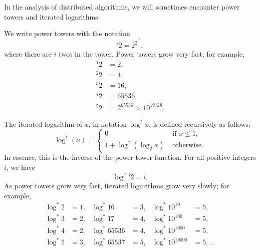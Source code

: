 
In the analysis of distributed algorithms, we will sometimes encounter power towers and iterated logarithms.



We write power towers with the notation
\[
    {}^i 2 = 2^{2^{\cdot^{\cdot^2}}},
\]
where there are $i$ twos in the tower. Power towers grow very fast; for example,
\begin{align*}
    {}^1 2 &= 2,\\
    {}^2 2 &= 4,\\
    {}^3 2 &= 16,\\
    {}^4 2 &= 65536,\\
    {}^5 2 &= 2^{65536} > 10^{19728}.
\end{align*}



The iterated logarithm of $x$, in notation $\log^* x$, is defined recursively as follows:
\[
    \log^*(x) = \begin{cases}
        0 & \text{ if $x \le 1$}, \\
        1 + \log^*(\log_2 x) & \text{ otherwise}.
    \end{cases}
\]
In essence, this is the inverse of the power tower function. For all positive integers $i$, we have
\[
    \log^* {}^i 2 = i.
\]
As power towers grow very fast, iterated logarithms grow very slowly; for example,
\begin{align*}
    \log^* 2 &= 1, &
    \log^* 16 &= 3, &
    \log^* 10^{10} &= 5, \\
    \log^* 3 &= 2, &
    \log^* 17 &= 4, &
    \log^* 10^{100} &= 5, \\
    \log^* 4 &= 2, &
    \log^* 65536 &= 4, &
    \log^* 10^{1000} &= 5, \\
    \log^* 5 &= 3, &
    \log^* 65537 &= 5, &
    \log^* 10^{10000} &= 5, \dotsc
\end{align*}
